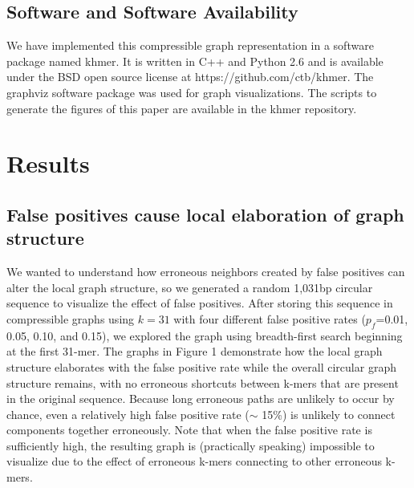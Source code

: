 \documentclass[12pt]{article} \usepackage{simplemargins}
\begin{document}

\subsection{Software and Software Availability}

We have implemented this compressible graph representation in a
software package named khmer.  It is written in C++ and Python 2.6 and
is available under the BSD open source license at
https://github.com/ctb/khmer.  The graphviz software package was used
for graph visualizations. The scripts to generate the figures of this
paper are available in the khmer repository.

\section{Results}

\subsection{False positives cause local elaboration of graph structure}

We wanted to understand how erroneous neighbors created by false
positives can alter the local graph structure, so we 
generated a random 1,031bp circular sequence to visualize the effect of false
positives.  After storing this sequence in compressible graphs using
$k=31$ with four different false positive rates ($p_f$=0.01, 0.05,
0.10, and 0.15), we explored the graph using breadth-first search
beginning at the first 31-mer.  The graphs in Figure 1 demonstrate how
the local graph structure elaborates with the false positive rate
while the overall circular graph structure remains, with no erroneous
shortcuts between k-mers that are present in the original
sequence. Because long erroneous paths are unlikely to occur by chance,
even a relatively high false positive rate ($\sim$ 15\%) is unlikely to
connect components together erroneously. Note that when the false
positive rate is sufficiently high, the resulting graph is
(practically speaking) impossible to visualize due to the effect of
erroneous k-mers connecting to other erroneous k-mers.
\end{document}
